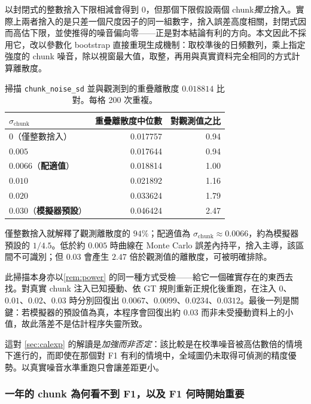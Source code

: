 \documentclass[12pt,a4paper,oneside]{article}
\begin{document}
以封閉式的整數捨入下限相減會得到 $0$，但那個下限假設兩個 chunk\emph{獨立}捨入。實際上兩者捨入的是只差一個尺度因子的同一組數字，捨入誤差高度相關，封閉式因而高估下限，並使推得的噪音偏向零——正是對本結論有利的方向。本文因此不採用它，改以參數化 bootstrap 直接重現生成機制：取校準後的日頻數列，乘上指定強度的 chunk 噪音，除以視窗最大值，取整，再用與真實資料完全相同的方式計算離散度。

\begin{table}[H]
\centering
\small
\caption{掃描 \texttt{chunk\_\allowbreak noise\_\allowbreak sd} 並與觀測到的重疊離散度 $0.018814$ 比對。每格 200 次重複。}
\label{tab:chunknoise}
\begin{tabular}{lrr}
\toprule
$\sigma_{\text{chunk}}$ & 重疊離散度中位數 & 對觀測值之比\\
\midrule
$0$（僅整數捨入） & 0.017757 & 0.94\\
$0.005$ & 0.017644 & 0.94\\
$0.0066$（\textbf{配適值}） & 0.018814 & 1.00\\
$0.010$ & 0.021892 & 1.16\\
$0.020$ & 0.033624 & 1.79\\
$0.030$（\textbf{模擬器預設}） & 0.046424 & 2.47\\
\bottomrule
\end{tabular}
\end{table}

僅整數捨入就解釋了觀測離散度的 $94\%$；配適值為 $\sigma_{\text{chunk}}\approx 0.0066$，約為模擬器預設的 $1/4.5$。低於約 $0.005$ 時曲線在 Monte Carlo 誤差內持平，捨入主導，該區間不可識別；但 $0.03$ 會產生 $2.47$ 倍於觀測值的離散度，可被明確排除。

此掃描本身亦以\cref{rem:power} 的同一種方式受檢——給它一個確實存在的東西去找。對真實 chunk 注入已知擾動、依 GT 規則重新正規化後重跑，在注入 $0$、$0.01$、$0.02$、$0.03$ 時分別回復出 $0.0067$、$0.0099$、$0.0234$、$0.0312$。最後一列是關鍵：若模擬器的預設值為真，本程序會回復出約 $0.03$ 而非未受擾動資料上的小值，故此落差不是估計程序失靈所致。

這對 \cref{sec:calexp} 的解讀是\emph{加強而非否定}：該比較是在校準噪音被高估數倍的情境下進行的，而即使在那個對 F1 有利的情境中，全域圖仍未取得可偵測的精度優勢。以真實噪音水準重跑只會讓差距更小。

\subsubsection{一年的 chunk 為何看不到 F1，以及 F1 何時開始重要}
\end{document}
